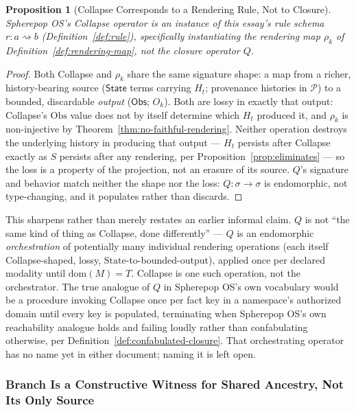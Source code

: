 \documentclass[11pt]{article}
\newtheorem{proposition}[theorem]{Proposition}
\theoremstyle{definition}
\begin{document}
\begin{proposition}[Collapse Corresponds to a Rendering Rule, Not to Closure]
\label{prop:collapse-is-rendering}
Spherepop OS's Collapse operator is an instance of this essay's rule schema $r : a \rightsquigarrow b$ (Definition~\ref{def:rule}), specifically instantiating the rendering map $\rho_k$ of Definition~\ref{def:rendering-map}, not the closure operator $Q$.
\end{proposition}
\begin{proof}
Both Collapse and $\rho_k$ share the same signature shape: a map from a richer, history-bearing source ($\mathsf{State}$ terms carrying $H_t$; provenance histories in $\mathcal{P}$) to a bounded, discardable \emph{output} ($\mathsf{Obs}$; $O_k$). Both are lossy in exactly that output: Collapse's $\mathrm{Obs}$ value does not by itself determine which $H_t$ produced it, and $\rho_k$ is non-injective by Theorem~\ref{thm:no-faithful-rendering}. Neither operation destroys the underlying history in producing that output --- $H_t$ persists after Collapse exactly as $S$ persists after any rendering, per Proposition~\ref{prop:eliminates} --- so the loss is a property of the projection, not an erasure of its source. $Q$'s signature and behavior match neither the shape nor the loss: $Q : \sigma \to \sigma$ is endomorphic, not type-changing, and it populates rather than discards.
\end{proof}

This sharpens rather than merely restates an earlier informal claim. $Q$ is not ``the same kind of thing as Collapse, done differently'' --- $Q$ is an endomorphic \emph{orchestration} of potentially many individual rendering operations (each itself Collapse-shaped, lossy, $\mathrm{State}$-to-bounded-output), applied once per declared modality until $\mathrm{dom}(M) = T$. Collapse is one such operation, not the orchestrator. The true analogue of $Q$ in Spherepop OS's own vocabulary would be a procedure invoking Collapse once per fact key in a namespace's authorized domain until every key is populated, terminating when Spherepop OS's own reachability analogue holds and failing loudly rather than confabulating otherwise, per Definition~\ref{def:confabulated-closure}. That orchestrating operator has no name yet in either document; naming it is left open.

\subsubsection{Branch Is a Constructive Witness for Shared Ancestry, Not Its Only Source}
\end{document}
